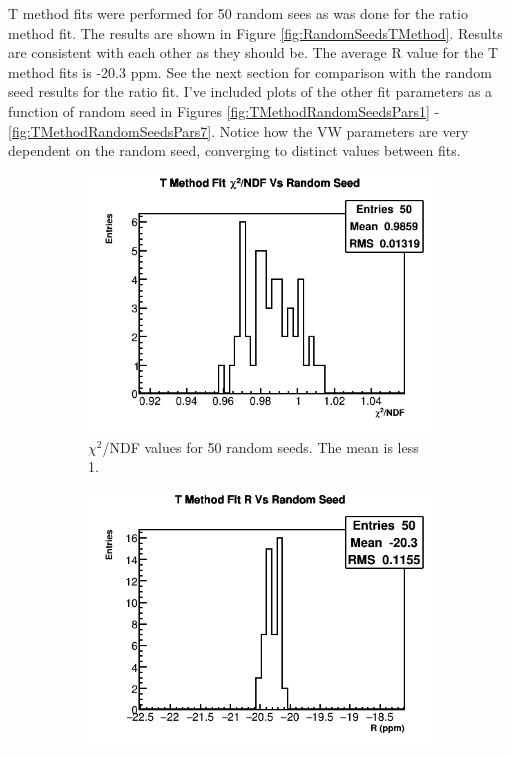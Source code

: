 \clearpage

	T method fits were performed for 50 random sees as was done for the ratio method fit. The results are shown in Figure \ref{fig:RandomSeedsTMethod}. Results are consistent with each other as they should be. The average R value for the T method fits is -20.3 ppm. See the next section for comparison with the random seed results for the ratio fit. I've included plots of the other fit parameters as a function of random seed in Figures \ref{fig:TMethodRandomSeedsPars1} - \ref{fig:TMethodRandomSeedsPars7}. Notice how the VW parameters are very dependent on the random seed, converging to distinct values between fits.

	\begin{figure}[]
	\centering
	    \begin{subfigure}[t]{0.45\textwidth}
		    \centering
			\includegraphics[width=\textwidth]{TMethod_Chi2NDF_Vs_Iter_Canv_hist}
		    \caption{$\chi^{2}$/NDF values for 50 random seeds. The mean is less 1.}
	    \end{subfigure}
	    \hspace{4mm}
	    \begin{subfigure}[t]{0.45\textwidth}
		    \centering
			\includegraphics[width=\textwidth]{TMethod_R_Vs_Iter_Canv_hist.png}

\end{subfigure}
\end{figure}
